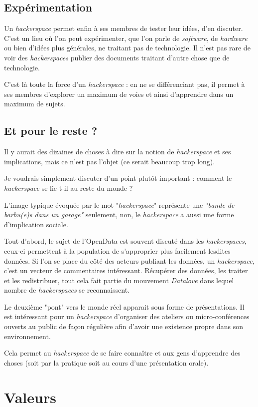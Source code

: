 \documentclass[a4paper, 11pt]{report}
\newcommand{\hs}{{\itshape hackerspace}}
\newcommand{\hsss}{{\itshape hackerspaces}}
\newcommand{\hw}{{\itshape hardware}}
\newcommand{\sw}{{\itshape software}}
\begin{document}
    \subsection{Expérimentation}

Un \hs{} permet enfin à ses membres de tester leur idées, d'en discuter. C'est un lieu où l'on peut expérimenter, que l'on
parle de \sw, de \hw{} ou bien d'idées plus générales, ne traitant pas de technologie. Il n'est pas rare de voir des
\hsss{} publier des documents traitant d'autre chose que de technologie.

C'est là toute la force d'un \hs{} : en ne se différenciant pas, il permet à ses membres d'explorer un maximum de voies et
ainsi d'apprendre dans un maximum de sujets.

    \subsection{Et pour le reste ?}

Il y aurait des dizaines de choses à dire sur la notion de \hs{} et ses implications, mais ce n'est pas l'objet (ce serait
beaucoup trop long).

Je voudrais simplement discuter d'un point plutôt important : comment le \hs{} se lie-t-il au reste du monde ?

L'image typique évoquée par le mot "\hs" représente une {\it "bande de barbu(e)s dans un garage"} seulement, non, le
\hs{} a aussi une forme d'implication sociale.

Tout d'abord, le sujet de l'OpenData est souvent discuté dans les \hsss, ceux-ci permettent à la population de
s'approprier plus facilement lesdites données. Si l'on se place du côté des acteurs publiant les données, un \hs,
c'est un vecteur de commentaires intéressant. Récupérer des données, les traiter et les redistribuer, tout cela fait
partie du mouvement {\it Datalove} dans lequel nombre de \hsss{} se reconnaissent.

Le deuxième "pont" vers le monde réel apparait sous forme de présentations. Il est intéressant pour un \hs{} d'organiser
des ateliers ou micro-conférences ouverts au public de façon régulière afin d'avoir une existence propre dans son
environnement.

Cela permet au \hs{} de se faire connaître et aux gens d'apprendre des choses (soit par la pratique soit au cours d'une
présentation orale).

    \section{Valeurs}
\end{document}
